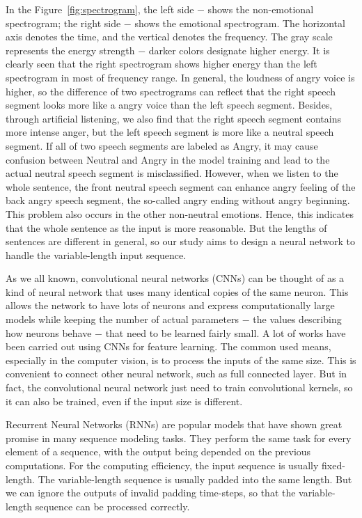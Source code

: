 \documentclass[a4paper]{article}
\begin{document}
In the Figure~\ref{fig:spectrogram}, the left side $-$ shows the non-emotional spectrogram; the right side $-$ shows the emotional spectrogram. The horizontal axis denotes the time, and the vertical denotes the frequency. The gray scale represents the energy strength $-$ darker colors designate higher energy. It is clearly seen that the right spectrogram shows higher energy than the left spectrogram in most of frequency range. In general, the loudness of angry voice is higher, so the difference of two spectrograms can reflect that the right speech segment looks more like a angry voice than the left speech segment. Besides, through artificial listening, we also find that the right speech segment contains more intense anger, but the left speech segment is more like a neutral speech segment. If all of two speech segments are labeled as Angry, it may cause confusion between Neutral and Angry in the model training and lead to the actual neutral speech segment is misclassified. However, when we listen to the whole sentence, the front neutral speech segment can enhance angry feeling of the back angry speech segment, the so-called angry ending without angry beginning. This problem also occurs in the other non-neutral emotions. Hence, this indicates that the whole sentence as the input is more reasonable. But the lengths of sentences are different in general, so our study aims to design a neural network to handle the variable-length input sequence. 

As we all known, convolutional neural networks (CNNs) can be thought of as a kind of neural network that uses many identical copies of the same neuron. This allows the network to have lots of neurons and express computationally large models while keeping the number of actual parameters $-$ the values describing how neurons behave $-$ that need to be learned fairly small. A lot of works have been carried out using CNNs for feature learning. The common used means, especially in the computer vision, is to process the inputs of the same size. This is convenient to connect other neural network, such as full connected layer. But in fact, the convolutional neural network just need to train convolutional kernels, so it can also be trained, even if the input size is different.

Recurrent Neural Networks (RNNs) are popular models that have shown great promise in many sequence modeling tasks. They perform the same task for every element of a sequence, with the output being depended on the previous computations. For the computing efficiency, the input sequence is usually fixed-length. The variable-length sequence is usually padded into the same length. But we can ignore the outputs of invalid padding time-steps, so that the variable-length sequence can be processed correctly.
\end{document}
